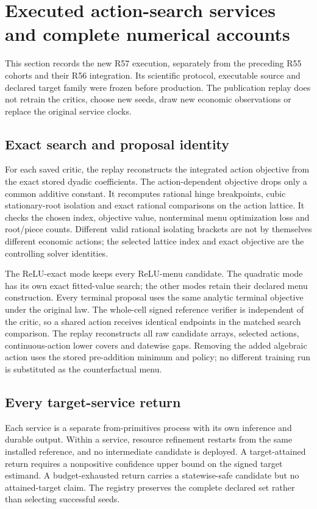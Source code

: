 \section{Executed action-search services and complete numerical accounts}\label{supp:execution57}
This section records the new R57 execution, separately from the preceding R55 cohorts and their R56 integration. Its scientific protocol, executable source and declared target family were frozen before production. The publication replay does not retrain the critics, choose new seeds, draw new economic observations or replace the original service clocks.

\subsection{Exact search and proposal identity}
For each saved critic, the replay reconstructs the integrated action objective from the exact stored dyadic coefficients. The action-dependent objective drops only a common additive constant. It recomputes rational hinge breakpoints, cubic stationary-root isolation and exact rational comparisons on the action lattice. It checks the chosen index, objective value, nonterminal menu optimization loss and root/piece counts. Different valid rational isolating brackets are not by themselves different economic actions; the selected lattice index and exact objective are the controlling solver identities.

The ReLU-exact mode keeps every ReLU-menu candidate. The quadratic mode has its own exact fitted-value search; the other modes retain their declared menu construction. Every terminal proposal uses the same analytic terminal objective under the original law. The whole-cell signed reference verifier is independent of the critic, so a shared action receives identical endpoints in the matched search comparison. The replay reconstructs all raw candidate arrays, selected actions, continuous-action lower covers and datewise gaps. Removing the added algebraic action uses the stored pre-addition minimum and policy; no different training run is substituted as the counterfactual menu.

\subsection{Every target-service return}



Each service is a separate from-primitives process with its own inference and durable output. Within a service, resource refinement restarts from the same installed reference, and no intermediate candidate is deployed. A target-attained return requires a nonpositive confidence upper bound on the signed target estimand. A budget-exhausted return carries a statewise-safe candidate but no attained-target claim. The registry preserves the complete declared set rather than selecting successful seeds.


